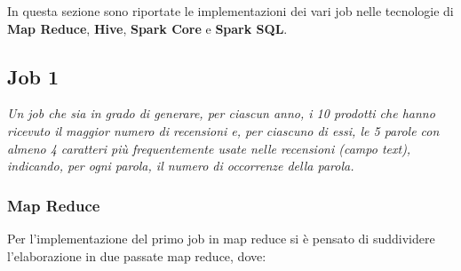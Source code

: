 In questa sezione sono riportate le implementazioni dei vari job nelle tecnologie di \textbf{Map Reduce}, \textbf{Hive}, \textbf{Spark Core} e \textbf{Spark SQL}.

\subsection{Job 1}
\textit{Un job che sia in grado di generare, per ciascun anno, i 10 prodotti che hanno ricevuto il maggior numero di recensioni e, per ciascuno di essi, le 5 parole con almeno 4 caratteri più frequentemente usate nelle recensioni (campo text), indicando, per ogni parola, il numero di occorrenze della parola.}
  \subsubsection{Map Reduce}
  Per l'implementazione del primo job in map reduce si è pensato di suddividere l’elaborazione in due passate map reduce, dove:
